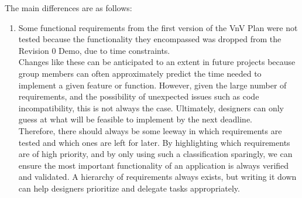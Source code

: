 \documentclass[12pt, titlepage]{article}
\begin{document}
The main differences are as follows:
\begin{enumerate}
    \item Some functional requirements from the first version of the VnV Plan
    were not tested because the functionality they encompassed was dropped from
    the Revision 0 Demo, due to time constraints.\\
    Changes like these can be anticipated to an extent in future projects
    because group members can often approximately predict the time needed to
    implement a given feature or function. However, given the large number of
    requirements, and the possibility of unexpected issues such as code
    incompatibility, this is not always the case. Ultimately, designers can only
    guess at what will be feasible to implement by the next deadline.\\
    Therefore, there should always be some leeway in which requirements are
    tested and which ones are left for later. By highlighting which requirements
    are of high priority, and by only using such a classification sparingly, we
    can ensure the most important functionality of an application is always
    verified and validated. A hierarchy of requirements always exists, but
    writing it down can help designers prioritize and delegate tasks
    appropriately.
\end{enumerate}
\end{document}
